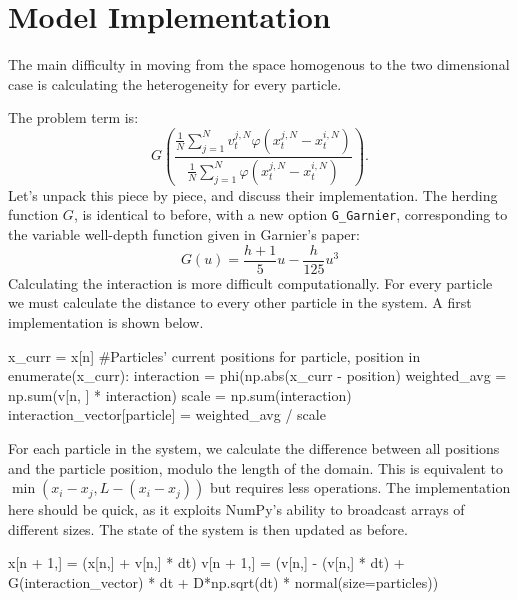 \documentclass[11pt,a4paper,dvipsnames]{article}
\begin{document}
    \section{Model Implementation}
        The main difficulty in moving from the space homogenous to the two dimensional case is calculating the heterogeneity for every particle.
        
        The problem term is:
        \begin{equation}\label{interaction}
            G\left(\frac{\frac{1}{N}\sum_{j=1}^N v_t^{j,N}\varphi(x^{j,N}_t-x^{i,N}_t)}{\frac{1}{N}\sum_{j=1}^N \varphi(x^{j,N}_t-x^{i,N}_t)}\right).
        \end{equation}
        Let's unpack this piece by piece, and discuss their implementation. The herding function $G$, is identical to before, with a new option \texttt{G\_Garnier}, corresponding to the variable well-depth function given in Garnier's paper:
        $$G(u) = \frac{h+1}{5}u - \frac{h}{125} u^3$$
        Calculating the interaction is more difficult computationally. For every particle we must calculate the distance to every other particle in the system. A first implementation is shown below.

        \begin{python}
x_curr = x[n] #Particles' current positions
   for particle, position in enumerate(x_curr):
       interaction = phi(np.abs(x_curr - position) %
       weighted_avg = np.sum(v[n, ] * interaction)
       scale = np.sum(interaction)
       interaction_vector[particle] = weighted_avg / scale
        \end{python}
        For each particle in the system, we calculate the difference between all positions and the particle position, modulo the length of the domain. This is equivalent to $\min(x_i-x_j, L-(x_i-x_j))$ but requires less operations. The implementation here should be quick, as it exploits NumPy's ability to broadcast arrays of different sizes. The state of the system is then updated as before.
        \begin{python}
x[n + 1,] = (x[n,] + v[n,] * dt) %
v[n + 1,] = (v[n,] - (v[n,] * dt) + G(interaction_vector) * dt
            + D*np.sqrt(dt) * normal(size=particles))
        \end{python}
        
\end{document}
